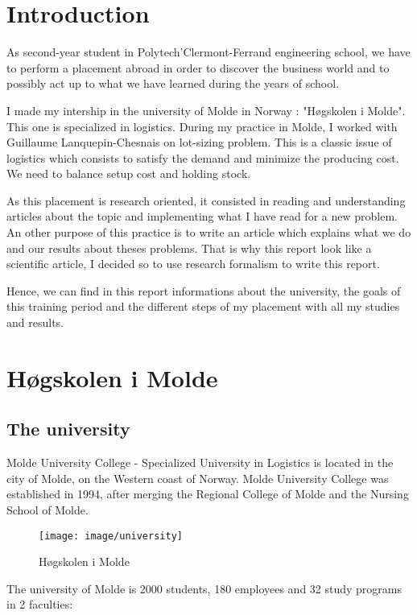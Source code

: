 \section*{Introduction}

As second-year student in Polytech’Clermont-Ferrand engineering school, we have
to perform a placement abroad in order to discover the business world and to
possibly act up to what we have learned during the years of school. 

I made my intership in the university of Molde in Norway : "Høgskolen i Molde".
This one is specialized in logistics. During my practice in Molde, I worked
with Guillaume Lanquepin-Chesnais on lot-sizing problem. This is a
classic issue of logistics which consists to satisfy the demand and minimize
the producing cost. We need to balance setup cost and holding stock.

As this placement is research oriented, it consisted in reading and
understanding articles about the topic and implementing what I have read for a
new problem. An other purpose of this practice is to write an article which
explains what we do and our results about theses problems. That is why this
report look like a scientific article, I decided so to use research formalism
to write this report.

Hence, we can find in this report informations about the university, the goals
of this training period and the different steps of my placement with all my
studies and results.
\newpage
\section{Høgskolen i Molde} 

\subsection{The university}

Molde University College - Specialized University in Logistics is located in the city of Molde, on the Western coast of Norway.  Molde University College  was established in 1994, after merging the Regional College of Molde and the Nursing School of Molde.

\begin{figure}[H]
\texttt{[image: image/university]}
\centering
\caption{Høgskolen i Molde}
\end{figure}

The university of Molde is 2000 students, 180 employees and 32 study programs in 2 faculties:


